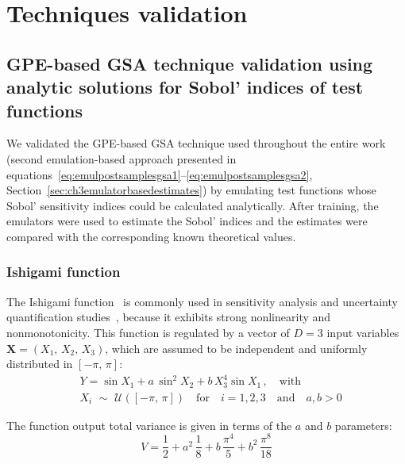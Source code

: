 \chapter{Techniques validation}\label{cha:chapterA}

%
%
%
\section{GPE-based GSA technique validation using analytic solutions for Sobol' indices of test functions}\label{chA:GPE-based_GSA_technique_validation_using_analytic_solutions_for_Sobol'_indices_of_test_functions}
We validated the GPE-based GSA technique used throughout the entire work (second emulation-based approach presented in equations~\eqref{eq:emulpostsamplesgsa1}--\eqref{eq:emulpostsamplesgsa2}, Section~\ref{sec:ch3emulatorbasedestimates}) by emulating test functions whose Sobol' sensitivity indices could be calculated analytically. After training, the emulators were used to estimate the Sobol' indices and the estimates were compared with the corresponding known theoretical values.

%
%
%
\subsection{Ishigami function}
The Ishigami function~\cite{Ishigami:1990} is commonly used in sensitivity analysis and uncertainty quantification studies~\cite{Saltelli:2007}, because it exhibits strong nonlinearity and nonmonotonicity. This function is regulated by a vector of $D=3$ input variables $\mathbf{X}=(X_1,\,X_2,\,X_3)$, which are assumed to be independent and uniformly distributed in $[-\pi,\,\pi]$:
%
\begin{align}\label{eq:ishigamifun}
	& Y = \sin{X_1} + a\,\sin^2{X_2} + b\,X_3^4\sin{X_1}\,,\quad\text{with} \\
	& X_i\,\,\sim\,\,\mathcal{U}([-\pi,\,\pi])\quad \text{for}\quad i=1,2,3\quad \text{and}\quad a,b>0
\end{align}

\vspace{0.2cm}\noindent
The function output total variance is given in terms of the $a$ and $b$ parameters:
%
\begin{equation}\label{eq:ifun_total_var}
	V = \frac{1}{2} + a^2\,\frac{1}{8} + b\,\frac{\pi^4}{5} + b^2\,\frac{\pi^8}{18}
\end{equation}


